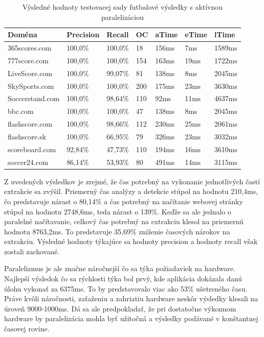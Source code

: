 \begin{table}[hbt]
\caption{Výsledné hodnoty testovacej sady futbalové výsledky s aktívnou paralelizáciou}
\centering
\begin{tabular}{|l|l|l|l|l|l|l|}
\hline
Doména          & Precision & Recall  & OC  & aTime & eTime & lTime  \\ \hline
365scores.com   & 100,0\%   & 100,0\% & 18  & 156ms & 7ms   & 1589ms  \\ \hline
777score.com    & 100,0\%   & 100,0\% & 154 & 163ms  & 19ms  & 1722ms \\ \hline
LiveScore.com   & 100,0\%   & 99,07\% & 81  & 138ms  & 8ms   & 2045ms  \\ \hline
SkySports.com   & 100,0\%   & 100,0\% & 200 & 175ms & 23ms  & 3630ms  \\ \hline
Soccerstand.com & 100,0\%   & 98,64\% & 110 & 92ms  & 11ms  & 4637ms \\ \hline
bbc.com         & 100,0\%   & 100,0\% & 47  &  138ms  & 8ms  & 2045ms \\ \hline
flashscore.com  & 100,0\%   & 98,66\% & 112 & 230ms  & 25ms   & 2061ms \\ \hline
flashscore.sk   & 100,0\%   & 66,95\% & 79  & 326ms & 23ms   & 3032ms \\ \hline
scoreboard.com  & 92,84\%   & 47,73\% & 110 & 194ms & 16ms  & 3610ms \\ \hline
soccer24.com    & 86,14\%   & 53,93\% & 80  & 491ms & 14ms  & 3115ms \\ \hline
\end{tabular}
\end{table}

Z uvedených výsledkov je zrejmé, že čas potrebný na vykonanie jednotlivých častí extrakcie sa zvýšil. Priemerný čas analýzy a detekcie stúpol na hodnotu 210,4ms, čo predstavuje nárast o 80,14\% a čas potrebný na načítanie webovej stránky stúpol na hodnotu 2748,6ms, teda nárast o 139\%. Keďže sa ale jednalo o paralelné načítavanie, celkový čas potrebný na extrakciu klesol na priemernú hodnotu 8763,2ms. To predstavuje 35,69\% zníženie časových nárokov na extrakciu. Výsledné hodnoty týkajúce sa hodnoty precision a hodnoty recall však zostali zachované.

Paralelizmus je ale značne náročnejší čo sa týka požiadaviek na hardware. Najlepší výsledok čo sa rýchlosti týka bol prvý, kde aplikácia dokázala danú úlohu vykonať za 6375ms. To by predstavovalo viac ako 53\% ušetreného času. Práve kvôli náročnosti, zaťaženiu a zahriatiu hardware neskôr výsledky klesali na úroveň 9000-1000ms. Dá sa ale predpokladať, že pri dostatočne výkonnom hardware by paralelizácia mohla byť užitočná a výsledky podávané v konštantnej časovej rovine.

